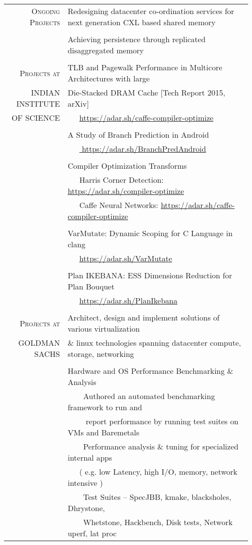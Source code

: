 \documentclass[a4paper,10pt]{article} %
\newcommand{\tabitem}{~~\llap{\textbullet}~~}
\begin{document}
\begin{tabular}{rp{12cm}}
\textsc{Ongoing Projects} & Redesigning datacenter co-ordination services for next generation CXL based shared memory \\
& \\
& Achieving persistence through replicated disaggregated memory \\
& \\
\textsc{Projects at} & TLB and Pagewalk Performance in Multicore Architectures with large \\
\textsc{INDIAN INSTITUTE} & Die-Stacked DRAM Cache \hfill [Tech Report 2015, arXiv]\\
\textsc{OF SCIENCE} & ~~~\href{https://adar.sh/caffe-compiler-optimize}{https://adar.sh/caffe-compiler-optimize}\\
& \\
& A Study of Branch Prediction in Android \\
& ~~~\href{https://adar.sh/BranchPredAndroid}{ https://adar.sh/BranchPredAndroid} \\
& \\
& Compiler Optimization Transforms\\
& ~~~Harris Corner Detection: \href{https://adar.sh/compiler-optimize}{https://adar.sh/compiler-optimize}\\
& ~~~Caffe Neural Networks:  \href{https://adar.sh/caffe-compiler-optimize}{https://adar.sh/caffe-compiler-optimize}\\
& \\
& VarMutate: Dynamic Scoping for C Language in clang\\
& ~~~\href{https://adar.sh/VarMutate}{https://adar.sh/VarMutate} \\
& \\
& Plan IKEBANA: ESS Dimensions Reduction for Plan Bouquet \\
& ~~~\href{https://adar.sh/PlanIkebana}{https://adar.sh/PlanIkebana}\\
&\\
\textsc{Projects at}  &  Architect, design and implement solutions of various virtualization \\
\textsc{GOLDMAN SACHS} &   \& linux technologies spanning datacenter compute, storage, networking \\
&\\
& Hardware and OS Performance Benchmarking \& Analysis\\
& \tabitem Authored an automated benchmarking framework to run and \\
& ~~~~ report performance by running test suites on VMs and Baremetals\\
& \tabitem Performance analysis \& tuning for specialized internal apps \\
& ~~~( e.g. low Latency, high I/O, memory, network intensive )\\
& \tabitem Test Suites – SpecJBB, kmake, blacksholes, Dhrystone, \\
& ~~~~Whetstone, Hackbench, Disk tests, Network uperf, lat proc \\


\end{tabular}
\end{document}
